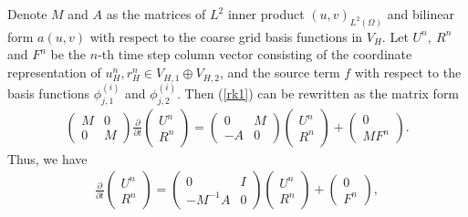 \documentclass[preprint,12pt]{elsarticle}
\begin{document}
Denote $M$ and $A$ as the matrices of $L^2$ inner product $(u,v)_{L^2(\Omega)}$ and bilinear form $a(u,v)$ with respect to the coarse grid basis functions in $V_H$. Let $U^n,~R^n$ and $F^n$ be the $n$-th time step column vector consisting of the coordinate representation of $u_H^n,r_H^n\in V_{H,1}\oplus V_{H,2}$, and the source term $f$ with respect to the basis functions $\phi_{j,1}^{(i)}$ and $\phi_{j,2}^{(i)}$. Then (\ref{rk1}) can be rewritten as the matrix form
\begin{equation}\label{rk31}
\begin{aligned}
\left(\begin{matrix}
    M&0\\0&M
\end{matrix}\right)\frac{\partial}{\partial t}\left(\begin{matrix}
    U^n\\R^n
\end{matrix}\right)=\left(\begin{matrix}
    0&M\\-A&0
\end{matrix}\right)\left(\begin{matrix}
    U^n\\R^n
\end{matrix}\right)+\left(\begin{matrix}
    0\\MF^n
\end{matrix}\right).
\end{aligned}
\end{equation}
 Thus, we have 
\begin{equation}\label{rk4}
\begin{aligned}
\frac{\partial}{\partial t}\left(\begin{matrix}
    U^n\\R^n
\end{matrix}\right)=\left(\begin{matrix}
    0&I\\-M^{-1}A&0
\end{matrix}\right)\left(\begin{matrix}
    U^n\\R^n
\end{matrix}\right)+\left(\begin{matrix}
    0\\F^n
\end{matrix}\right),
\end{aligned}
\end{equation}
\end{document}
